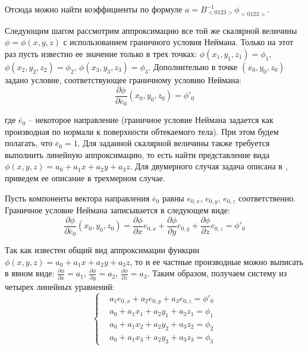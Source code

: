 Отсюда можно найти коэффициенты по формуле $a = B_{<0123>}^{-1}\phi_{<0123>}$.

Следующим шагом рассмотрим аппроксимацию все той же скалярной величины $\phi = \phi(x, y, z)$ с использованием граничного условия Неймана.
Только на этот раз пусть известно ее значение только в трех точках: $\phi(x_1, y_1, z_1) = \phi_1$, $\phi(x_2, y_2, z_2) = \phi_2$, $\phi(x_3, y_3, z_3) = \phi_3$.
Дополнительно в точке $(x_0, y_0, z_0)$ задано условие, соответствующее граничному условию Неймана:
\begin{equation}
	\frac{\partial{\phi}}{\partial{\overline{e}_0}}(x_0, y_0, z_0) = \phi'_0
\end{equation}

где $\overline{e}_0$ -- некоторое направление (граничное условие Неймана задается как производная по нормали к поверхности обтекаемого тела).
При этом будем полагать, что $\overline{e}_0 = 1$.
Для заданной скалярной величины также требуется выполнить линейную аппроксимацию, то есть найти представление вида $\phi(x, y, z) = a_0 + a_1x + a_2y + a_3z$.
Для двумерного случая задача описана в \cite{Tseng2003Immersed}, приведем ее описание в трехмерном случае.

Пусть компоненты вектора направления $\overline{e}_0$ равны $e_{0,x}$, $e_{0,y}$, $e_{0,z}$ соответственно.
Граничное условие Неймана записывается в следующем виде:
\begin{equation}
	\frac{\partial{\phi}}{\partial{\overline{e}_0}}(x_0, y_0, z_0) = \frac{\partial{\phi}}{\partial{x}}e_{0,x} + \frac{\partial{\phi}}{\partial{y}}e_{0,y} + \frac{\partial{\phi}}{\partial{z}}e_{0,z} = \phi'_0
\end{equation}

Так как известен общий вид аппроксимации функции $\phi(x, y, z) = a_0 + a_1x + a_2y + a_3z$, то и ее частные производные можно выписать в явном виде: $\frac{\partial{\phi}}{\partial{x}} = a_1$, $\frac{\partial{\phi}}{\partial{y}} = a_2$, $\frac{\partial{\phi}}{\partial{z}} = a_3$.
Таким образом, получаем систему из четырех линейных уравнений:
\begin{equation}\label{eqn:text_1_ibm_sys1}
	\left\{
		\begin{aligned}
			& a_1e_{0,x} + a_2e_{0,y} + a_3e_{0,z} = \phi'_0 \\
			& a_0 + a_1x_1 + a_2y_1 + a_3z_1 = \phi_1 \\
			& a_0 + a_1x_2 + a_2y_2 + a_3z_2 = \phi_2 \\
			& a_0 + a_1x_3 + a_2y_3 + a_3z_3 = \phi_3
		\end{aligned}
	\right.
\end{equation}


